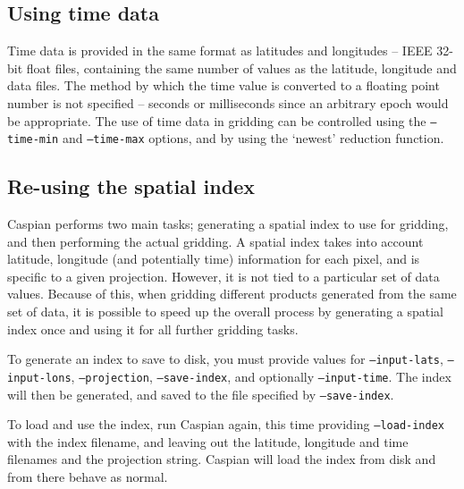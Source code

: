 \documentclass[a4paper,12pt]{article}
\begin{document}
\subsection{Using time data}
Time data is provided in the same format as latitudes and longitudes -- IEEE 32-bit float files, containing the same number of values as the latitude, longitude and data files. The method by which the time value is converted to a floating point number is not specified -- seconds or milliseconds since an arbitrary epoch would be appropriate. The use of time data in gridding can be controlled using the \texttt{--time-min} and \texttt{--time-max} options, and by using the `newest' reduction function.

\subsection{Re-using the spatial index}
Caspian performs two main tasks; generating a spatial index to use for gridding, and then performing the actual gridding. A spatial index takes into account latitude, longitude (and potentially time) information for each pixel, and is specific to a given projection. However, it is not tied to a particular set of data values. Because of this, when gridding different products generated from the same set of data, it is possible to speed up the overall process by generating a spatial index once and using it for all further gridding tasks.

To generate an index to save to disk, you must provide values for \texttt{--input-lats}, \texttt{--input-lons}, \texttt{--projection}, \texttt{--save-index}, and optionally \texttt{--input-time}. The index will then be generated, and saved to the file specified by \texttt{--save-index}.

To load and use the index, run Caspian again, this time providing \texttt{--load-index} with the index filename, and leaving out the latitude, longitude and time filenames and the projection string. Caspian will load the index from disk and from there behave as normal.
\end{document}
